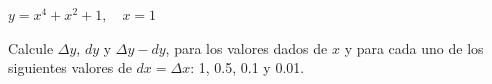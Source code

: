 \item $y = x^4 + x^2 + 1, \quad x = 1$
\par
Calcule $\Delta y$, $dy$ y $\Delta y - dy$, para los valores dados de $x$ y para cada uno de los siguientes valores de $dx = \Delta x$: 1, 0.5, 0.1 y 0.01.
